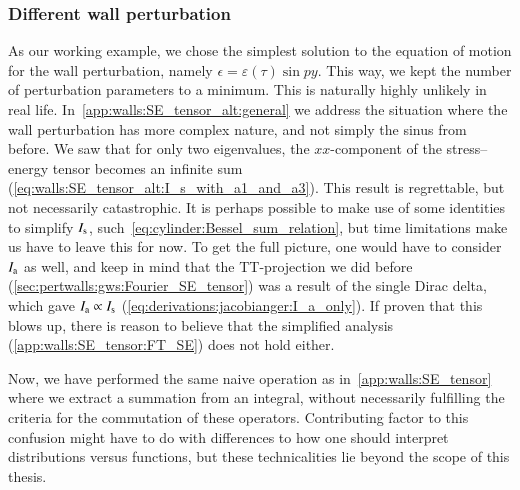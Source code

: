 \subsubsection{Different wall perturbation}
    As our working example, we chose the simplest solution to the equation of motion for the wall perturbation, namely $\epsilon= \varepsilon(\tau)\sin{py}$. This way, we kept the number of perturbation parameters to a minimum. This is naturally highly unlikely in real life. 
    In~\cref{app:walls:SE_tensor_alt:general} we address the situation where the wall perturbation has more complex nature, and not simply the sinus from before. We saw that for only two eigenvalues, the $xx$-component of the stress--energy tensor becomes an infinite sum (\cref{eq:walls:SE_tensor_alt:I_s_with_a1_and_a3}). %
    This result is regrettable, but not necessarily catastrophic. %
    It is perhaps possible to make use of some identities to simplify $I_\mathrm{s}$, such~\cref{eq:cylinder:Bessel_sum_relation}, 
    but time limitations make us have to leave this for now. To get the full picture, one would have to consider $I_\mathrm{a}$ as well, and keep in mind that the TT-projection we did before (\cref{sec:pertwalls:gws:Fourier_SE_tensor}) was a result of the single Dirac delta, which gave $I_\mathrm{a}\propto I_\mathrm{s}$ (\cref{eq:derivations:jacobianger:I_a_only}). %
    If proven that this blows up, there is reason to believe that the simplified analysis (\cref{app:walls:SE_tensor:FT_SE}) does not hold either. %


    Now, we have performed the same naive operation as in~\cref{app:walls:SE_tensor} where we extract a summation from an integral, without necessarily fulfilling the criteria for the commutation of these operators. Contributing factor to this confusion might have to do with differences to how one should interpret distributions versus functions, but these technicalities lie beyond the scope of this thesis.

    




